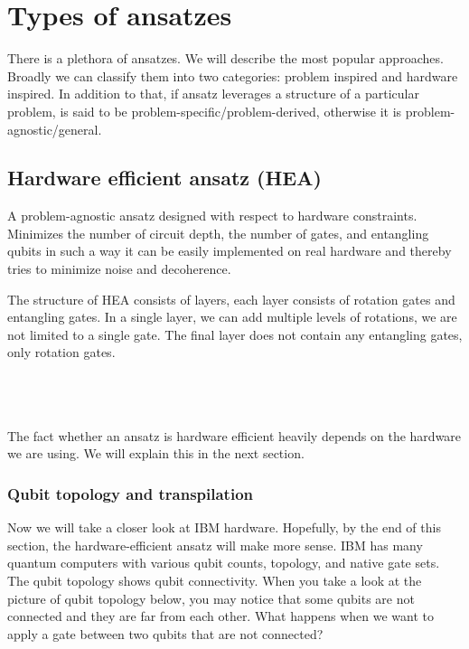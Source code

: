 \section{Types of ansatzes}
There is a plethora of ansatzes. We will describe the most popular approaches. Broadly we can classify them into two categories: problem inspired and hardware inspired. In addition to that, if ansatz leverages a structure of a particular problem, is said to be problem-specific/problem-derived, otherwise it is problem-agnostic/general. 

\subsection{Hardware efficient ansatz (HEA)}
A problem-agnostic ansatz designed with respect to hardware constraints. Minimizes the number of circuit depth, the number of gates, and entangling qubits in such a way it can be easily implemented on real hardware and thereby tries to minimize noise and decoherence.

The structure of HEA consists of layers, each layer consists of rotation gates and entangling gates. In a single layer, we can add multiple levels of rotations, we are not limited to a single gate. The final layer does not contain any entangling gates, only rotation gates.

\\
\\
\\

The fact whether an ansatz is hardware efficient heavily depends on the hardware we are using. We will explain this in the next section.

\subsubsection{Qubit topology and transpilation}
Now we will take a closer look at IBM hardware. Hopefully, by the end of this section, the hardware-efficient ansatz will make more sense. IBM has many quantum computers with various qubit counts, topology, and native gate sets. The qubit topology shows qubit connectivity. When you take a look at the picture of qubit topology below, you may notice that some qubits are not connected and they are far from each other. What happens when we want to apply a gate between two qubits that are not connected? 



